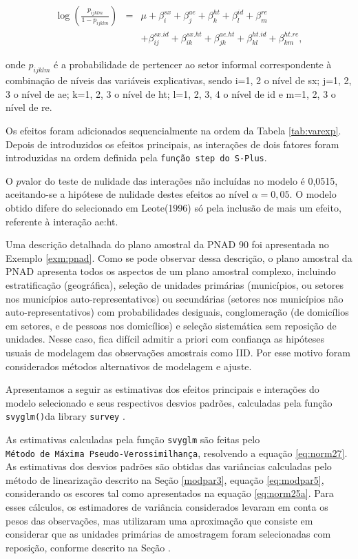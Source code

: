 \documentclass[]{book}
\theoremstyle{definition}
\theoremstyle{definition}
\theoremstyle{definition}
\theoremstyle{remark}
\begin{document}
\begin{eqnarray}
\log \left( \frac{p_{ijklm}}{1-p_{ijklm}}\right) &=&\mu +\beta
_{i}^{sx}+\beta _{j}^{ae}+\beta _{k}^{ht}+\beta _{l}^{id}+\beta _{m}^{re}
\label{eq:norm28} \\
&&+\beta _{ij}^{sx.id}+\beta _{ik}^{sx.ht}+\beta _{jk}^{ae.ht}+\beta
_{kl}^{ht.id}+\beta _{km}^{ht.re},  \nonumber
\end{eqnarray}

onde \(p_{ijklm}\) é a probabilidade de pertencer ao setor informal
correspondente à combinação de níveis das variáveis explicativas, sendo
i=1, 2 o nível de sx; j=1, 2, 3 o nível de ae; k=1, 2, 3 o nível de ht;
l=1, 2, 3, 4 o nível de id e m=1, 2, 3 o nível de re.

Os efeitos foram adicionados sequencialmente na ordem da Tabela
\ref{tab:varexp}. Depois de introduzidos os efeitos principais, as
interações de dois fatores foram introduzidas na ordem definida pela
\texttt{função\ step\ do\ S-Plus}.

O \(p\)valor do teste de nulidade das interações não incluídas no modelo
é 0,0515, aceitando-se a hipótese de nulidade destes efeitos ao nível
\(\alpha =0,05\). O modelo obtido difere do selecionado em Leote(1996)
só pela inclusão de mais um efeito, referente à interação ae:ht.

Uma descrição detalhada do plano amostral da PNAD 90 foi apresentada no
Exemplo \ref{exm:pnad}. Como se pode observar dessa descrição, o plano
amostral da PNAD apresenta todos os aspectos de um plano amostral
complexo, incluindo estratificação (geográfica), seleção de unidades
primárias (municípios, ou setores nos municípios auto-representativos)
ou secundárias (setores nos municípios não auto-representativos) com
probabilidades desiguais, conglomeração (de domicílios em setores, e de
pessoas nos domicílios) e seleção sistemática sem reposição de unidades.
Nesse caso, fica difícil admitir a priori com confiança as hipóteses
usuais de modelagem das observações amostrais como IID. Por esse motivo
foram considerados métodos alternativos de modelagem e ajuste.

Apresentamos a seguir as estimativas dos efeitos principais e interações
do modelo selecionado e seus respectivos desvios padrões, calculadas
pela função \texttt{svyglm()}da library \texttt{survey}
\citep{R-survey}.

As estimativas calculadas pela função \texttt{svyglm} são feitas pelo
\texttt{Método\ de\ Máxima\ Pseudo-Verossimilhança}, resolvendo a
equação \eqref{eq:norm27}. As estimativas dos desvios padrões são obtidas
das variâncias calculadas pelo método de linearização descrito na Seção
\ref{modpar3}, equação \eqref{eq:modpar5}, considerando os escores tal
como apresentados na equação \eqref{eq:norm25a}. Para esses cálculos, os
estimadores de variância considerados levaram em conta os pesos das
observações, mas utilizaram uma aproximação que consiste em considerar
que as unidades primárias de amostragem foram selecionadas com
reposição, conforme descrito na Seção .
\end{document}
